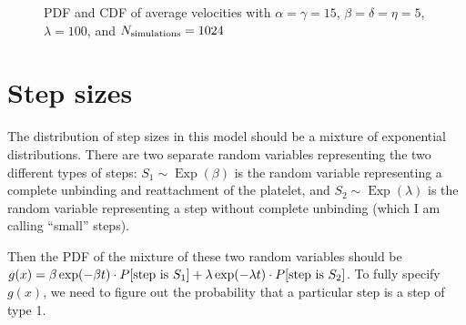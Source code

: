 \documentclass{article}
\newcommand{\tn}{\textnormal}
\DeclareMathOperator{\Exp}{Exp}
\begin{document}
\begin{figure}
  \centering
  \begin{subfigure}{0.48\textwidth}
  \end{subfigure}
  \hfill
  \begin{subfigure}{0.48\textwidth}
  \end{subfigure}
  \caption{PDF and CDF of average velocities with $\alpha = \gamma =
    15$, $\beta = \delta = \eta = 5$, $\lambda = 100$, and
    $N_\tn{simulations} = 1024$}
  \label{fig:exact-cmp-large-a}  
\end{figure}

\section{Step sizes}
\label{sec:step-sizes}

The distribution of step sizes in this model should be a mixture of
exponential distributions. There are two separate random variables
representing the two different types of steps: $S_1 \sim \Exp(\beta)$
is the random variable representing a complete unbinding and
reattachment of the platelet, and $S_2 \sim \Exp(\lambda)$ is the
random variable representing a step without complete unbinding (which
I am calling ``small'' steps).

Then the PDF of the mixture of these two random variables should be
$g(x) = \beta \exp(-\beta t) \cdot P[\tn{step is }S_1] + \lambda
\exp(-\lambda t) \cdot P[\tn{step is }S_2]$. To fully specify $g(x)$,
we need to figure out the probability that a particular step is a step
of type 1.
\end{document}
